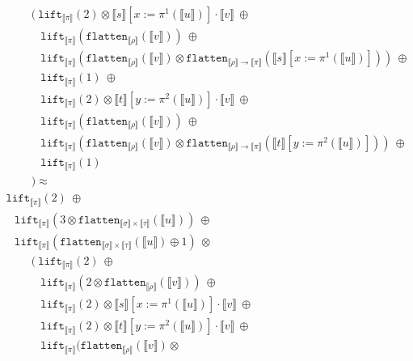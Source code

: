 \documentclass[runningheads,a4paper]{llncs}
\newcommand{\typeinterpret}[1]{\llbracket #1 \rrbracket}
\newcommand{\interpret}[1]{\llbracket #1 \rrbracket}
\newcommand{\arrtype}{\rightarrow}
\newcommand{\flatten}{\mathtt{flatten}}
\newcommand{\lift}{\mathtt{lift}}
\begin{document}
\begin{itemize}
\[\begin{array}{l}
  \phantom{ABC}
  (\ \lift_{\typeinterpret{\pi}}(2) \otimes \interpret{s}[x:=\pi^1(
    \interpret{u})] \cdot \interpret{v}\ \oplus \\
  \phantom{ABCD}
  \lift_{\typeinterpret{\pi}}(\flatten_{
    \typeinterpret{\rho}}(\interpret{v}))\ \oplus \\
  \phantom{ABCD}
  \lift_{\typeinterpret{\pi}}(
    \flatten_{\typeinterpret{\rho}}(\interpret{v}) \otimes
    \flatten_{\typeinterpret{\rho} \arrtype \typeinterpret{\pi}}(
    \interpret{s}[x:=\pi^1(\interpret{u})]))\ \oplus \\
  \phantom{ABCD}
  \lift_{\typeinterpret{\pi}}(1)\ \oplus \\
  \phantom{ABCD}
  \lift_{\typeinterpret{\pi}}(2) \otimes \interpret{t}[y:=\pi^2(
    \interpret{u})] \cdot \interpret{v}\ \oplus \\
  \phantom{ABCD}
  \lift_{\typeinterpret{\pi}}(
    \flatten_{\typeinterpret{\rho}}(\interpret{v}))\ \oplus \\
  \phantom{ABCD}
  \lift_{\typeinterpret{\pi}}(
    \flatten_{\typeinterpret{\rho}}(\interpret{v}) \otimes
    \flatten_{\typeinterpret{\rho} \arrtype
    \typeinterpret{\pi}}(\interpret{t}[y:=\pi^2(\interpret{u})]))\ 
    \oplus\\
  \phantom{ABCD}
  \lift_{\typeinterpret{\pi}}(1) \\
  \phantom{ABC}) \approx \\
  \lift_{\typeinterpret{\pi}}(2)\ \oplus \\
  \phantom{A}
  \lift_{\typeinterpret{\pi}}(3 \otimes \flatten_{\typeinterpret{\sigma}
    \times \typeinterpret{\tau}}(\interpret{u}))\ \oplus \\
  \phantom{A}
  \lift_{\typeinterpret{\pi}}(\flatten_{\typeinterpret{\sigma} \times
    \typeinterpret{\tau}}(\interpret{u}) \oplus 1)\ \otimes \\
  \phantom{ABC}
  (\ \lift_{\typeinterpret{\pi}}(2)\ \oplus \\
  \phantom{ABCD}
  \lift_{\typeinterpret{\pi}}(2 \otimes \flatten_{
    \typeinterpret{\rho}}(\interpret{v}))\ \oplus \\
  \phantom{ABCD}
  \lift_{\typeinterpret{\pi}}(2) \otimes \interpret{s}[x:=\pi^1(
    \interpret{u})] \cdot \interpret{v}\ \oplus \\
  \phantom{ABCD}
  \lift_{\typeinterpret{\pi}}(2) \otimes \interpret{t}[y:=\pi^2(
    \interpret{u})] \cdot \interpret{v}\ \oplus \\
  \phantom{ABCD}
  \lift_{\typeinterpret{\pi}}(
    \flatten_{\typeinterpret{\rho}}(\interpret{v}) \otimes

\end{array}\]
\end{itemize}
\end{document}
